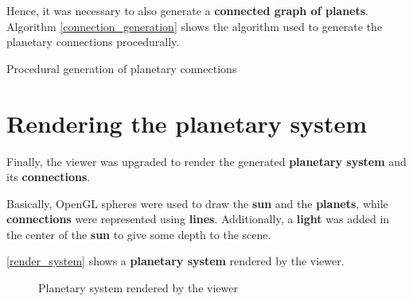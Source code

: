 \documentclass[a4paper,11pt,titlepage,abstract,numbers=noenddot,automark,mnsy,intlimits,rgb,dvipsnames]{report}
\begin{document}
Hence, it was necessary to also generate a \textbf{connected graph of planets}. Algorithm \autoref{connection_generation} shows
the algorithm used to generate the planetary connections procedurally.
\begin{algorithm}[H]
\caption{Procedural generation of planetary connections}
\label{connection_generation}
\begin{algorithmic}
\ENDFOR
\ENDWHILE
\end{algorithmic}
\end{algorithm}
\section{Rendering the planetary system}
Finally, the viewer was upgraded to render the generated \textbf{planetary system} and its \textbf{connections}.

Basically, OpenGL spheres were used to draw the \textbf{sun} and the \textbf{planets}, while \textbf{connections} were represented
using \textbf{lines}. Additionally, a \textbf{light} was added in the center of the \textbf{sun} to give some depth to the scene.

\autoref{render_system} shows a \textbf{planetary system} rendered by the viewer.
\begin{figure}[H]
\begin{center}
\noindent{}
\end{center}
\caption{Planetary system rendered by the viewer}
\label{render_system}
\end{figure}
\end{document}
